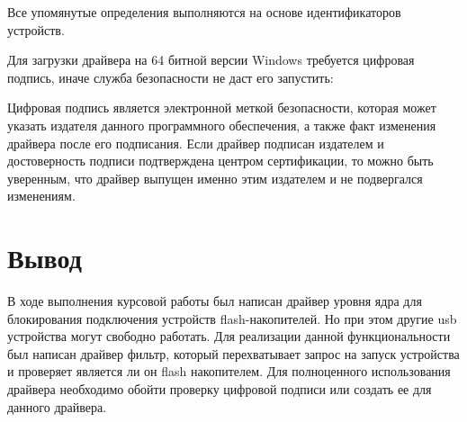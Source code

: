 \documentclass[14pt,a4paper]{article}
\begin{document}
\par Все упомянутые определения выполняются на основе идентификаторов устройств. \\

\par Для загрузки драйвера на 64 битной версии Windows требуется цифровая подпись, иначе служба безопасности не даст его запустить: 

\begin{figure}[H]
  \centering
  \caption{}
\end{figure}

Цифровая подпись является электронной меткой безопасности, которая может указать издателя данного программного обеспечения, а также факт изменения драйвера после его подписания. Если драйвер подписан издателем и достоверность подписи подтверждена центром сертификации, то можно быть уверенным, что драйвер выпущен именно этим издателем и не подвергался изменениям.

\section{Вывод}
    В ходе выполнения курсовой работы был написан драйвер уровня ядра для блокирования подключения устройств flash-накопителей. Но при этом другие usb устройства могут свободно работать. Для реализации данной функциональности был написан драйвер фильтр, который перехватывает запрос на запуск устройства и проверяет является ли он flash накопителем. Для полноценного использования драйвера необходимо обойти проверку цифровой подписи или создать ее для данного драйвера.
\end{document}
